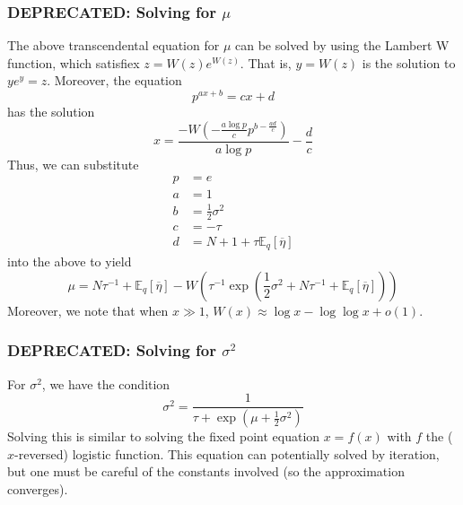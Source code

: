 \documentclass[11pt]{article}
\begin{document}
\subsubsection{DEPRECATED: Solving for $\mu$}
The above transcendental equation for $\mu$ can be solved by using the Lambert W function, which satisfiex $z = W(z)e^{W(z)}$. That is, $y = W(z)$ is the solution to $ye^y = z$. Moreover, the equation
\begin{equation}
    p^{ax + b} = cx + d
\end{equation}
has the solution
\begin{equation}
    x = \frac{-W\left(-\frac{a \log p}{c}
    p^{b - \frac{ad}{c}} \right)}{a \log p} - \frac{d}{c}
\end{equation}
Thus, we can substitute
\begin{align}
    p &= e \\
    a &= 1 \\
    b &= \frac{1}{2} \sigma^2 \\
    c &= -\tau \\
    d &= N + 1 + \tau \mathbb{E}_q[\overline{\eta}]
\end{align}
into the above to yield
\begin{equation}
    \mu = N\tau^{-1} + \mathbb{E}_q[\overline{\eta}] -
    W\left(\tau^{-1} \exp \left(
    \frac{1}{2}\sigma^2 + N\tau^{-1} + \mathbb{E}_q[\overline{\eta}]
    \right)\right)
\end{equation}
Moreover, we note that when $x \gg 1$, $W(x) \approx \log x - \log \log x + o(1)$.

\subsubsection{DEPRECATED: Solving for $\sigma^2$}
For $\sigma^2$, we have the condition
\begin{equation}
    \sigma^2 = \frac{1}{\tau + \exp\left(\mu + \frac{1}{2}\sigma^2 \right)}
\end{equation}
Solving this is similar to solving the fixed point equation $x = f(x)$ with $f$ the ($x$-reversed) logistic function. This equation can potentially solved by iteration, but one must be careful of the constants involved (so the approximation converges).
\end{document}
